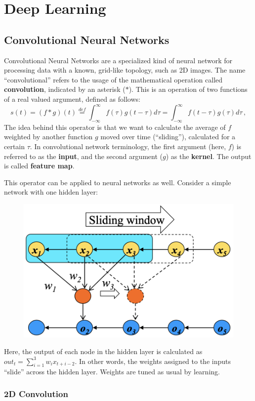 \chapter{Deep Learning}

\section{Convolutional Neural Networks}

Convolutional Neural Networks are a specialized kind of neural network for processing data with a known, grid-like topology, such as 2D images. The name ``convolutional'' refers to the usage of the mathematical operation called \textbf{convolution}, indicated by an asterisk ($*$). This is an operation of two functions of a real valued argument, defined as follows:
\begin{equation*}
    s(t) = (f * g)(t) \stackrel{def}{=} \int_{-\infty}^{\infty} f(\tau)g(t - \tau) d \tau = \int_{-\infty}^{\infty} f(t - \tau)g(\tau) d\tau \,,
\end{equation*}
The idea behind this operator is that we want to calculate the average of $f$ weighted by another function $g$ moved over time (``sliding''), calculated for a certain $\tau$. In convolutional network terminology, the first argument (here, $f$) is referred to as the \textbf{input}, and the second argument ($g$) as the \textbf{kernel}. The output is called \textbf{feature map}.

This operator can be applied to neural networks as well. Consider a simple network with one hidden layer:
\begin{figure}[h]
    \centering
    \includegraphics[width=0.45\linewidth]{img/CNN_simple.png}
\end{figure}

Here, the output of each node in the hidden layer is calculated as $out_t = \sum_{i=1}^3 w_i x_{t+i-2}$. In other words, the weights assigned to the inputs ``slide'' across the hidden layer. Weights are tuned as usual by learning.

\subsection{2D Convolution}


